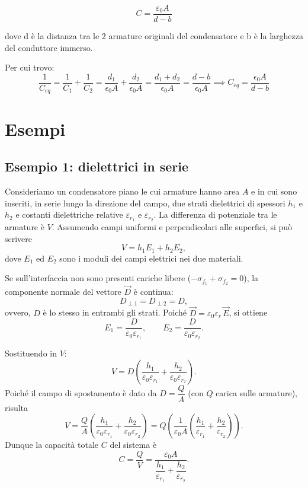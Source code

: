\documentclass{book}
\begin{document}
$$
C = \frac{\varepsilon_0 A}{d-b}
$$

 dove d è la distanza tra le 2 armature originali del condensatore e b è la larghezza del conduttore immerso.

 Per cui trovo:
$$
\frac{1}{C_{eq}} = \frac{1}{C_1} + \frac{1}{C_2} = \frac{d_1}{\epsilon_0 A} + \frac{d_2}{\epsilon_0 A} = \frac{d_1 + d_2}{\epsilon_0 A} = \frac{d - b}{\epsilon_0 A} \implies C_{eq} = \frac{\epsilon_0 A}{d - b}
$$


\section{Esempi}

\subsection*{Esempio 1: dielettrici in serie}

Consideriamo un condensatore piano le cui armature hanno area \(A\) e in cui sono inseriti, in serie lungo la direzione del campo, due strati dielettrici di spessori \(h_1\) e \(h_2\) e costanti dielettriche relative \(\varepsilon_{r_1}\) e \(\varepsilon_{r_2}\). La differenza di potenziale tra le armature è \(V\). Assumendo campi uniformi e perpendicolari alle superfici, si può scrivere
\[
V = h_1 E_1 + h_2 E_2,
\]
dove \(E_1\) ed \(E_2\) sono i moduli dei campi elettrici nei due materiali.

Se sull'interfaccia non sono presenti cariche libere ($-\sigma_{{f}_{1}}+ \sigma_{{f}_{2}} = 0$), la componente normale del vettore \(\vec{D}\) è continua:
\[
D_{\perp1} = D_{\perp2} = D,
\]
ovvero, \(D\) è lo stesso in entrambi gli strati. Poiché \(\vec{D}=\varepsilon_0\varepsilon_r\,\vec{E}\), si ottiene
\[
E_1 = \frac{D}{\varepsilon_0\varepsilon_{r_1}},\qquad
E_2 = \frac{D}{\varepsilon_0\varepsilon_{r_2}}.
\]

Sostituendo in \(V\):
\[
V = D\left(\frac{h_1}{\varepsilon_0\varepsilon_{r_1}}+\frac{h_2}{\varepsilon_0\varepsilon_{r_2}}\right).
\]
Poiché il campo di spostamento è dato da \(D = \dfrac{Q}{A}\) (con \(Q\) carica sulle armature), risulta
\[
V = \frac{Q}{A}\left(\frac{h_1}{\varepsilon_0\varepsilon_{r_1}}+\frac{h_2}{\varepsilon_0\varepsilon_{r_2}}\right)
= Q\left(\frac{1}{\varepsilon_0 A}\left(\frac{h_1}{\varepsilon_{r_1}}+\frac{h_2}{\varepsilon_{r_2}}\right)\right).
\]
Dunque la capacità totale \(C\) del sistema è
\[
C=\frac{Q}{V}=\frac{\varepsilon_0 A}{\dfrac{h_1}{\varepsilon_{r_1}}+\dfrac{h_2}{\varepsilon_{r_2}}}.
\]
\end{document}
